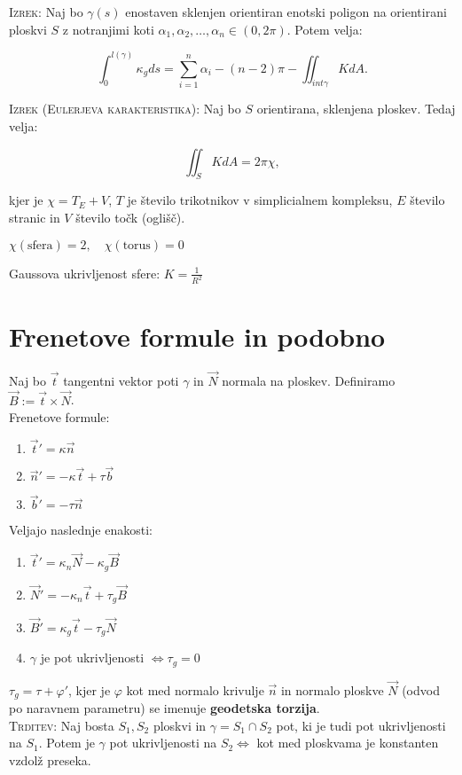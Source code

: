 \documentclass[8pt,a4paper]{amsart}
\theoremstyle{definition} %
\theoremstyle{plain} %
\begin{document}
\textsc{Izrek: }Naj bo $\gamma (s)$ enostaven sklenjen orientiran enotski poligon na orientirani ploskvi $S$ z notranjimi koti $\alpha_1, \alpha_2, \ldots ,\alpha_n \in (0,2 \pi)$. Potem velja:

$$
\int_0^{l(\gamma)} \kappa_g ds = \sum_{i=1}^n \alpha_i - (n-2)\pi - \iint_{int \gamma}K dA.
$$

\textsc{Izrek (Eulerjeva karakteristika): }Naj bo $S$ orientirana, sklenjena ploskev. Tedaj velja:

$$
\iint_S KdA = 2\pi \chi ,
$$

kjer je $\chi = T_E+V$, $T$ je število trikotnikov v simplicialnem kompleksu, $E$ število stranic in $V$ število točk (oglišč).

$\chi (\text{sfera}) = 2, \quad \chi(\text{torus}) = 0$

Gaussova ukrivljenost sfere: $K = \frac{1}{R^2}$

\section*{\textbf{Frenetove formule in podobno}} %

Naj bo $\vec{t}$ tangentni vektor poti $\gamma$ in $\vec{N}$ normala na ploskev. Definiramo $\vec{B}:=\vec{t} \times \vec{N}$. 
\\

Frenetove formule:

\begin{enumerate}

\item $\vec{t}' = \kappa \vec{n}$

\item $\vec{n}'= -\kappa \vec{t} + \tau \vec{b}$

\item $\vec{b}' = -\tau \vec{n}$

\end{enumerate}

Veljajo naslednje enakosti:

\begin{enumerate}

\item $\vec{t}' = \kappa_n \vec{N} - \kappa_g \vec{B}$

\item $\vec{N}' = -\kappa_n \vec{t} + \tau_g \vec{B}$

\item $\vec{B}' = \kappa_g \vec{t} - \tau_g \vec{N}$

\item $\gamma$ je pot ukrivljenosti $\Longleftrightarrow \tau_g = 0$

\end{enumerate}

$\tau_g = \tau + \varphi' $, kjer je $\varphi$ kot med normalo krivulje $\vec{n}$ in normalo ploskve $\vec{N}$ (odvod po naravnem parametru) se imenuje \textbf{geodetska torzija}.
\\

\textsc{Trditev: }Naj bosta $S_1,S_2$ ploskvi in $\gamma = S_1 \cap S_2$ pot, ki je tudi pot ukrivljenosti na $S_1$. Potem je $\gamma$ pot ukrivljenosti na $S_2 \Longleftrightarrow$ kot med ploskvama je konstanten vzdolž preseka.
\end{document}
